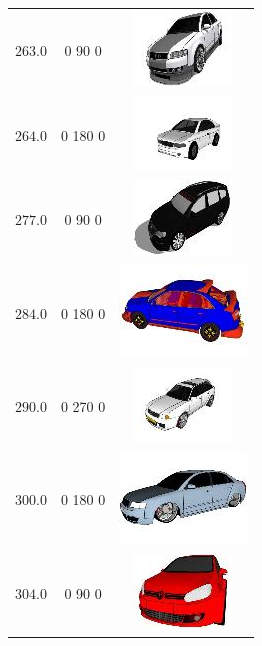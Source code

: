 \begin{longtable}{ccc}
	$263.0$ & 0 90 0 & \includegraphics{models/d157abdbd22c3088a73f47f4261c01dd.jpg}\\
	$264.0$ & 0 180 0 & \includegraphics{models/b204ced86d4b5e549d40dc50674e6347.jpg}\\
	$277.0$ & 0 90 0 & \includegraphics{models/8efced0ecbd1dd99713391d1ea8d388.jpg}\\
	$284.0$ & 0 180 0 & \includegraphics{models/1f10079ff71023f96287ddf2264aed3.jpg}\\
	$290.0$ & 0 270 0 & \includegraphics{models/d26622dce4185160d90cecb09ba6f1b8.jpg}\\
	$300.0$ & 0 180 0 & \includegraphics{models/597aea9b7b1aebdc39a4779124f9b320.jpg}\\
	$304.0$ & 0 90 0 & \includegraphics{models/3ae62dd54a2dd59ad7d2e5d7d40456b9.jpg}\\

\end{longtable}
